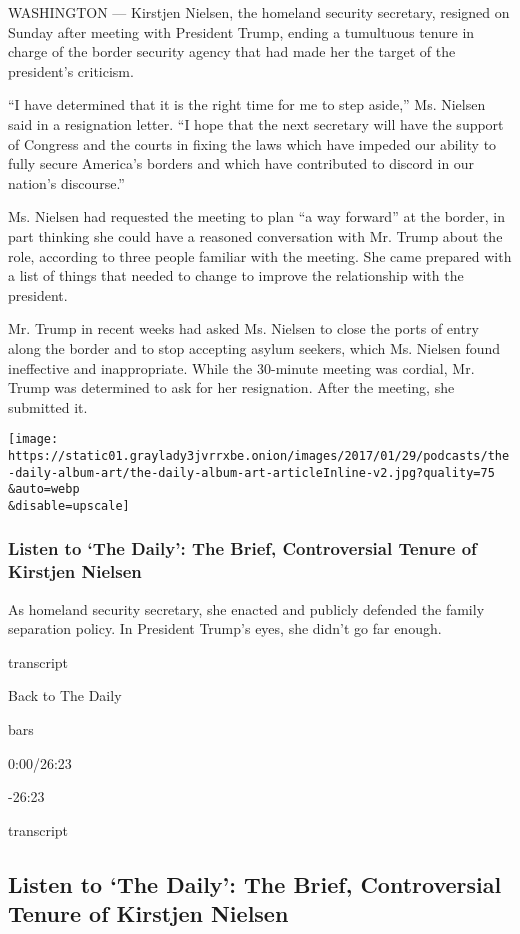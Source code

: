 WASHINGTON --- Kirstjen Nielsen, the homeland security secretary,
resigned on Sunday after meeting with President Trump, ending a
tumultuous tenure in charge of the border security agency that had made
her the target of the president's criticism.

``I have determined that it is the right time for me to step aside,''
Ms. Nielsen said in a resignation letter. ``I hope that the next
secretary will have the support of Congress and the courts in fixing the
laws which have impeded our ability to fully secure America's borders
and which have contributed to discord in our nation's discourse.''

Ms. Nielsen had requested the meeting to plan ``a way forward'' at the
border, in part thinking she could have a reasoned conversation with Mr.
Trump about the role, according to three people familiar with the
meeting. She came prepared with a list of things that needed to change
to improve the relationship with the president.

Mr. Trump in recent weeks had asked Ms. Nielsen to close the ports of
entry along the border and to stop accepting asylum seekers, which Ms.
Nielsen found ineffective and inappropriate. While the 30-minute meeting
was cordial, Mr. Trump was determined to ask for her resignation. After
the meeting, she submitted it.

\texttt{[image: https://static01.graylady3jvrrxbe.onion/images/2017/01/29/podcasts/the-daily-album-art/the-daily-album-art-articleInline-v2.jpg?quality=75\\\&auto=webp\\\&disable=upscale]}

\hypertarget{listen-to-the-daily-the-brief-controversial-tenure-of-kirstjen-nielsen}{%
\subsubsection{Listen to `The Daily': The Brief, Controversial Tenure of
Kirstjen
Nielsen}\label{listen-to-the-daily-the-brief-controversial-tenure-of-kirstjen-nielsen}}

As homeland security secretary, she enacted and publicly defended the
family separation policy. In President Trump's eyes, she didn't go far
enough.

transcript

Back to The Daily

bars

0:00/26:23

-26:23

transcript

\hypertarget{listen-to-the-daily-the-brief-controversial-tenure-of-kirstjen-nielsen-1}{%
\subsection{Listen to `The Daily': The Brief, Controversial Tenure of
Kirstjen
Nielsen}\label{listen-to-the-daily-the-brief-controversial-tenure-of-kirstjen-nielsen-1}}

